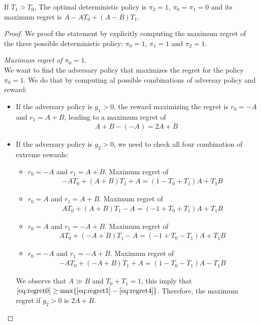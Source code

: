 \begin{proposition}\label{theorem:opt_det}
If $T_1 > T_0$, The optimal deterministic policy is $\pi_{2}=1$, $\pi_{0}=\pi_{1}=0$ 
and its maximum regret is $A- A T_0 +(A-B) T_1$. 
\end{proposition}
\begin{proof}
We proof the statement by explicitly computing the maximum regret of the three possible deterministic policy: $\pi_0=1$, $\pi_1=1$ and $\pi_2=1$.



\textit{Maximum regret of $\pi_0=1$}.\\
We want to find the adversary policy that maximizes the regret for the policy $\pi_0=1$. We do that by computing al possible combinations of adversay policy and reward:
\begin{itemize}
\item If the adversary policy is $g_1> 0$, the reward maximizing the regret is $r_0 = -A$ and $r_1 = A+B$, leading to a maximum regret of 
\begin{align}
A+B-(-A)=2A+B \label{eq:regret0}
\end{align}
\item If the adversary policy is $g_2>0$, we need to check all four combination of extreme rewards:
\begin{itemize}
\item $r_0 = -A$ and $r_1= A+B$. Maximum regret of
\begin{align}
-A T_0 + (A+B)T_1 + A = (1-T_0 + T_1)A + T_1 B \label{eq:regret1}
\end{align}
\item $r_0 = A$ and $r_1= A+B$. Maximum regret of
\begin{align}
A T_0 + (A+B)T_1 - A = (-1+T_0 + T_1)A + T_1 B  \label{eq:regret2}
\end{align}
\item $r_0 = A$ and $r_1= -A+B$. Maximum regret of
\begin{align} 
A T_0 + (-A+B)T_1 - A =  (-1+T_0 - T_1)A + T_1 B \label{eq:regret3}
\end{align}
\item $r_0 = -A$ and $r_1= -A+B$. Maximum regret of
\begin{align}
-A T_0 + (-A+B)T_1 + A =  (1 - T_0 - T_1)A - T_1 B \label{eq:regret4}
\end{align}
\end{itemize} 
We observe that $A\gg B$ and $T_0+T_1= 1$, this imply that  $\eqref{eq:regret0} \geq \max\{\eqref{eq:regret1}-\eqref{eq:regret4} \}$. Therefore, the maximum regret if $g_2>0$ is $2A+B$.
\end{itemize} 





\end{proof}
